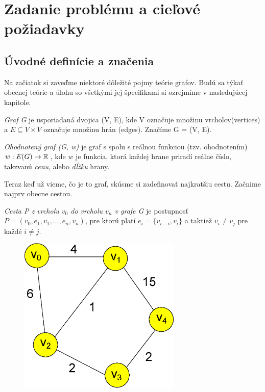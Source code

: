 \chapter{Zadanie problému a cieľové požiadavky}

\section{Úvodné definície a značenia}
Na začiatok si zaveďme niektoré dôležité pojmy teórie grafov.
Budú sa týkať obecnej teórie a úlohu so všetkými jej špecifikami si ozrejmíme v nasledujúcej kapitole.
\begin{define}
{\sl Graf G} je usporiadaná dvojica (V, E), kde V označuje množinu vrcholov(vertices) a $E \subseteq V \times V $ označuje množinu hrán (edges). Značíme G = (V, E).
\end{define}

\begin{define}
{\sl Ohodnotený graf (G, w)} je graf s spolu s reálnou funkciou (tzv. ohodnotením)
$w: E(G) \to \mathbb{R}\,$, kde $w$ je funkcia, ktorá každej hrane priradí
reálne číslo, takzvanú \emph{cenu}, alebo \emph{dĺžku} hrany.
\end{define}


Teraz keď už vieme, čo je to graf, skúsme si zadefinovať najkratšiu cestu. Začnime najprv obecne cestou.

\begin{define}
{\sl Cesta P z vrcholu $v_0$ do vrcholu $v_n$ v grafe G } je postupnosť $P = (v_{0},e_{1},v_{1},\dots, e_{n}, v_{n})$,
pre ktorú platí $e_{i} = \{v_{i-i},v_{i}\}$ a taktiež
$v_{i} \ne v_{j}$ pre každé $i \ne j$.
\end{define}

\begin{figure}[p]
\includegraphics[height=7.5cm]{./img/graf.eps}
\end{figure}


